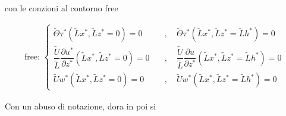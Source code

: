 \documentclass[letterpaper,10pt,italian]{jupyterBook}
\begin{document}
\begin{sphinxVerbatim}[commandchars=\\\{\}]
con le conzioni al contorno \PYGZdq{}free\PYGZdq{}
\end{sphinxVerbatim}
\begin{equation*}
\begin{split}\text{free: } \left\{
    \begin{aligned}
      \tilde{\Theta}\tau^*(\tilde{L}x^*,\tilde{L}z^*=0) = 0 \quad & , \quad  
      \tilde{\Theta}\tau^*(\tilde{L}x^*,\tilde{L}z^*=\tilde{L}h^*) = 0 \\
      \dfrac{\tilde{U}}{\tilde{L}}\dfrac{\partial u^*}{\partial z^*}(\tilde{L}x^*,\tilde{L}z^*=0) = 0 \quad  & , \quad 
      \dfrac{\tilde{U}}{\tilde{L}}\dfrac{\partial u}{\partial z^*}(\tilde{L}x^*,\tilde{L}z^*=\tilde{L}h^*) = 0 \\
      \tilde{U} w^*(\tilde{L}x^*,\tilde{L}z^*=0) = 0 \quad  & , \quad 
      \tilde{U} w^*(\tilde{L}x^*,\tilde{L}z^*=\tilde{L}h^*) = 0
    \end{aligned} \right.\end{split}
\end{equation*}
\begin{sphinxVerbatim}[commandchars=\\\{\}]
Con un abuso di notazione, d\PYGZsq{}ora in poi si
\end{sphinxVerbatim}
\end{document}
